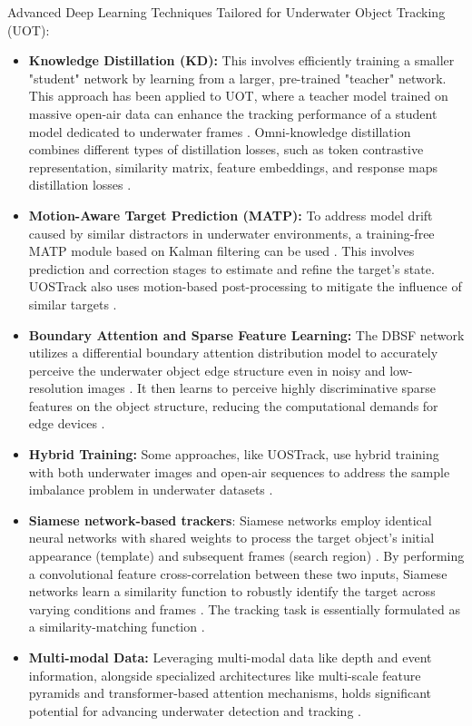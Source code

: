 Advanced Deep Learning Techniques Tailored for Underwater Object Tracking (UOT):
\begin{itemize}
    \item \textbf{Knowledge Distillation (KD):} This involves efficiently training a smaller "student" network by learning from a larger, pre-trained "teacher" network. This approach has been applied to UOT, where a teacher model trained on massive open-air data can enhance the tracking performance of a student model dedicated to underwater frames \cite{zhang2024webuot}. Omni-knowledge distillation combines different types of distillation losses, such as token contrastive representation, similarity matrix, feature embeddings, and response maps distillation losses \cite{zhang2024webuot}.
    \item \textbf{Motion-Aware Target Prediction (MATP):} To address model drift caused by similar distractors in underwater environments, a training-free MATP module based on Kalman filtering can be used \cite{zhang2024webuot}. This involves prediction and correction stages to estimate and refine the target's state. UOSTrack also uses motion-based post-processing to mitigate the influence of similar targets \cite{qiu2024boundary, zhang2024webuot}.
    \item \textbf{Boundary Attention and Sparse Feature Learning:} The DBSF network utilizes a differential boundary attention distribution model to accurately perceive the underwater object edge structure even in noisy and low-resolution images \cite{qiu2024boundary}. It then learns to perceive highly discriminative sparse features on the object structure, reducing the computational demands for edge devices \cite{qiu2024boundary}.
    \item \textbf{Hybrid Training:} Some approaches, like UOSTrack, use hybrid training with both underwater images and open-air sequences to address the sample imbalance problem in underwater datasets \cite{zhang2024webuot}.
    \item \textbf{Siamese network-based trackers}: Siamese networks employ identical neural networks with shared weights to process the target object's initial appearance (template) and subsequent frames (search region) \cite{elmezain2025advancing}. By performing a convolutional feature cross-correlation between these two inputs, Siamese networks learn a similarity function to robustly identify the target across varying conditions and frames \cite{elmezain2025advancing, zhao2020correlation, wu2023hybrid}. The tracking task is essentially formulated as a similarity-matching function \cite{wu2023hybrid}.
    \item \textbf{Multi-modal Data:} Leveraging multi-modal data like depth and event information, alongside specialized architectures like multi-scale feature pyramids and transformer-based attention mechanisms, holds significant potential for advancing underwater detection and tracking \cite{elmezain2025advancing}.
\end{itemize}

